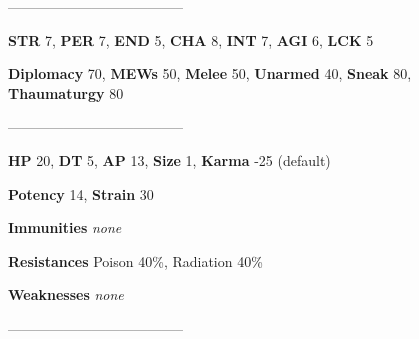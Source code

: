 \documentclass[11pt,a4paper,twocolumn]{book}
\begin{document}
%		
%	
%		
	
				--------------------------------------
	
	\noindent
	\textbf{STR} 7, \textbf{PER} 7, \textbf{END} 5, \textbf{CHA} 8, \textbf{INT} 7, \textbf{AGI} 6, \textbf{LCK} 5
	
	\noindent
	\textbf{Diplomacy} 70, \textbf{MEWs} 50, \textbf{Melee} 50, \textbf{Unarmed} 40, \textbf{Sneak} 80, \textbf{Thaumaturgy} 80	
	
	--------------------------------------
	
	\noindent
	\textbf{HP} 20, \textbf{DT} 5, \textbf{AP} 13, \textbf{Size} 1, \textbf{Karma} -25 (default)
	
	\noindent
	\textbf{Potency} 14, \textbf{Strain} 30
	
	\noindent
	\textbf{Immunities} \emph{none}
	
	\noindent
	\textbf{Resistances} Poison 40\%, Radiation 40\%
	
	\noindent
	\textbf{Weaknesses} \emph{none} %
	
	--------------------------------------
	
\end{document}
